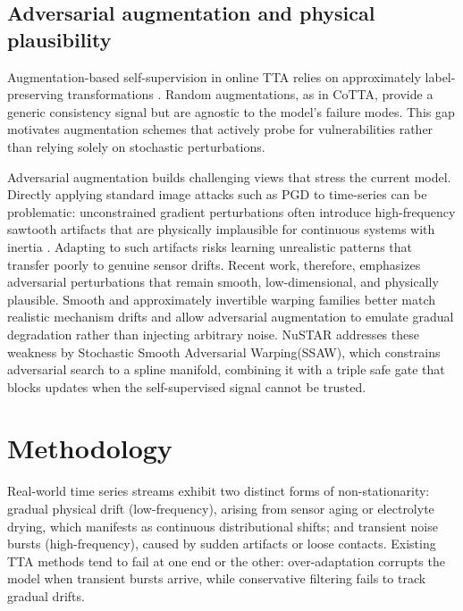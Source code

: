 \documentclass[sigconf, screen, review, anonymous]{acmart}
\theoremstyle{plain}
\theoremstyle{definition}
\theoremstyle{remark}
\begin{document}
\subsection{Adversarial augmentation and physical plausibility}
Augmentation-based self-supervision in online TTA relies on approximately label-preserving transformations \citep{chen2020simple}. Random augmentations, as in CoTTA, provide a generic consistency signal but are agnostic to the model's failure modes. This gap motivates augmentation schemes that actively probe for vulnerabilities rather than relying solely on stochastic perturbations.

Adversarial augmentation builds challenging views that stress the current model. Directly applying standard image attacks such as PGD \citep{madry2018towards} to time-series can be problematic: unconstrained gradient perturbations often introduce high-frequency sawtooth artifacts that are physically implausible for continuous systems with inertia \citep{tu2020physically,pialla2025time}. Adapting to such artifacts risks learning unrealistic patterns that transfer poorly to genuine sensor drifts.
Recent work, therefore, emphasizes adversarial perturbations that remain smooth, low-dimensional, and physically plausible. Smooth and approximately invertible warping families \citep{demirel2025shifting} better match realistic mechanism drifts and allow adversarial augmentation to emulate gradual degradation rather than injecting arbitrary noise. NuSTAR addresses these weakness by Stochastic Smooth Adversarial Warping(SSAW), which constrains adversarial search to a spline manifold, combining it with a triple safe gate that blocks updates when the self-supervised signal cannot be trusted.


\section{Methodology}
\label{sec:method}

Real-world time series streams exhibit two distinct forms of non-stationarity: gradual physical drift (low-frequency), arising from sensor aging or electrolyte drying, which manifests as continuous distributional shifts; and transient noise bursts (high-frequency), caused by sudden artifacts or loose contacts. Existing TTA methods tend to fail at one end or the other: over-adaptation corrupts the model when transient bursts arrive, while conservative filtering fails to track gradual drifts.
\end{document}
